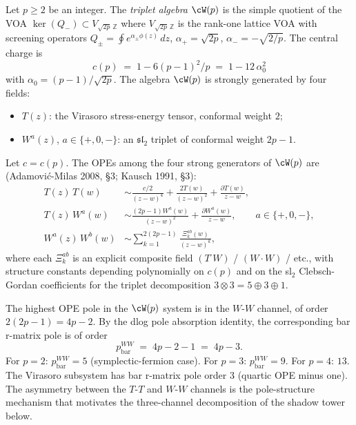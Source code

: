 \begin{definition}
\label{def:triplet-wp-generators}
Let $p \ge 2$ be an integer. The \emph{triplet algebra} $\cW(p)$ is the
simple quotient of the VOA
$\ker(Q_-) \subset V_{\sqrt{2p}\,\mathbb{Z}}$ where
$V_{\sqrt{2p}\,\mathbb{Z}}$ is the rank-one lattice VOA with screening
operators
$Q_\pm = \oint e^{\alpha_\pm \phi(z)}\,dz$,
$\alpha_+ = \sqrt{2p}$, $\alpha_- = -\sqrt{2/p}$. The central charge
is
\[
 c(p) \;=\; 1 - 6(p-1)^2 / p \;=\; 1 - 12\,\alpha_0^2
\]
with $\alpha_0 = (p-1)/\sqrt{2p}$. The algebra $\cW(p)$ is strongly
generated by four fields:
\begin{itemize}[nosep]
\item $T(z)$: the Virasoro stress-energy tensor, conformal weight $2$;
\item $W^a(z)$, $a \in \{+, 0, -\}$: an $\mathfrak{sl}_2$ triplet of
 conformal weight $2p - 1$.
\end{itemize}
\end{definition}

\begin{proposition}
\label{prop:wp-ope-structure}
Let $c = c(p)$. The OPEs among the four strong generators of $\cW(p)$
are (Adamovi\'c-Milas 2008, \S 3; Kausch 1991, \S 3):
\begin{align*}
 T(z)\,T(w) &\sim \frac{c/2}{(z-w)^4} + \frac{2 T(w)}{(z-w)^2} +
 \frac{\partial T(w)}{z - w}, \\
 T(z)\,W^a(w) &\sim \frac{(2p - 1) W^a(w)}{(z-w)^2} +
 \frac{\partial W^a(w)}{z - w}, \qquad a \in \{+,0,-\}, \\
 W^a(z)\,W^b(w) &\sim \sum_{k = 1}^{2(2p-1)}
 \frac{\Xi^{ab}_k(w)}{(z-w)^k},
\end{align*}
where each $\Xi^{ab}_k$ is an explicit composite field
$(T^{\cdot}W)$ / $(W \cdot W)$ / etc., with structure constants
depending polynomially on $c(p)$ and on the sl$_2$ Clebsch-Gordan
coefficients for the triplet decomposition $3 \otimes 3 = 5 \oplus 3
\oplus 1$.
\end{proposition}

\begin{remark}
\label{rem:wp-pole-order-check}
The highest OPE pole in the $\cW(p)$ system is in the $W$-$W$ channel,
of order $2(2p - 1) = 4p - 2$. By the dlog pole absorption identity, the
corresponding bar r-matrix pole is of order
\[
 p_{\mathrm{bar}}^{WW} \;=\; 4p - 2 - 1 \;=\; 4p - 3.
\]
For $p = 2$: $p_{\mathrm{bar}}^{WW} = 5$ (symplectic-fermion case).
For $p = 3$: $p_{\mathrm{bar}}^{WW} = 9$. For $p = 4$: $13$.
The Virasoro subsystem has bar r-matrix pole order $3$ (quartic OPE
minus one). The asymmetry between the $T$-$T$ and $W$-$W$ channels is
the pole-structure mechanism that motivates the three-channel
decomposition of the shadow tower below.
\end{remark}

